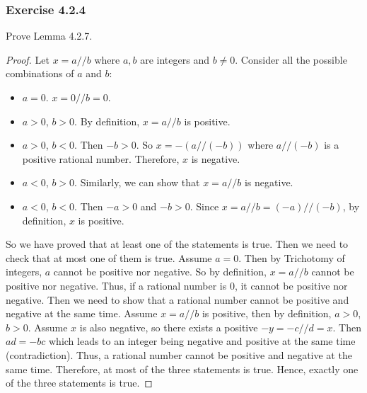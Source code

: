 \documentclass[12pt, letter]{article}
\begin{document}
\subsubsection*{Exercise 4.2.4}
Prove Lemma 4.2.7. 
\begin{proof}
    Let $x=a//b$ where $a,b$ are integers and $b\ne 0$. Consider all the possible combinations of $a$ and $b$:
    \begin{itemize}
        \item $a=0$.
        $x=0//b=0$. 
        \item $a>0$, $b>0$.
        By definition, $x=a//b$ is positive.
        \item $a>0$, $b<0$.
        Then $-b>0$. So $x=-(a//(-b))$ where $a//(-b)$ is a positive rational number. Therefore, $x$ is negative.
        \item $a<0$, $b>0$.
        Similarly, we can show that $x=a//b$ is negative.
        \item $a<0$, $b<0$.
        Then $-a>0$ and $-b>0$. Since $x=a//b=(-a)//(-b)$, by definition, $x$ is positive.
    \end{itemize}
    So we have proved that at least one of the statements is true. Then we need to check that at most one of them is true. Assume $a=0$. Then by Trichotomy of 
    integers, $a$ cannot be positive nor negative. So by definition, $x=a//b$ cannot be positive nor negative. Thus, if a rational number is 0, it cannot be positive nor negative.
    Then we need to show that a rational number cannot be positive and negative at the same time. Assume $x=a//b$ is positive, then by definition, $a>0$, $b>0$.
    Assume $x$ is also negative, so there exists a positive $-y=-c//d=x$. Then $ad=-bc$ which leads to an integer being negative and positive at the same time (contradiction).
    Thus, a rational number cannot be positive and negative at the same time. Therefore, at most of the three statements is true. Hence, exactly one of the three 
    statements is true.
\end{proof}
\end{document}
